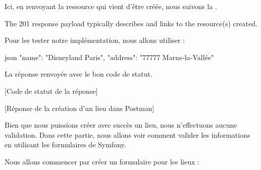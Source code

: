 \documentclass[big]{zmdocument}
\begin{document}
Ici, en renvoyant la ressource qui vient d'être créée, nous suivons la .



\begin{Quotation}
The 201 response payload typically describes and links to the resource(s) created.
\end{Quotation}



Pour les tester notre implémentation, nous allons utiliser :



\begin{CodeBlock}{json}
{
    "name": "Disneyland Paris",
    "address": "77777 Marne-la-Vallée"
}
\end{CodeBlock}



La réponse renvoyée avec le bon code de statut.



[Code de statut de la réponse]


[Réponse de la création d'un lieu dans Postman]




Bien que nous puissions créer avec succès un lieu, nous n'effectuons aucune validation. Dans cette partie, nous allons voir comment valider les informations en utilisant les formulaires de Symfony.



Nous allons commencer par créer un formulaire pour les lieux :



\end{document}
